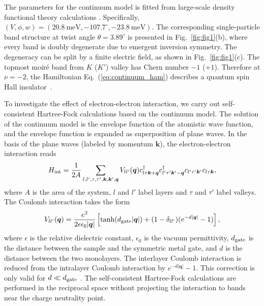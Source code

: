 \documentclass[twocolumn,aps,prl,superscriptaddress]{revtex4-2}
\begin{document}
The parameters for the continuum model is fitted from large-scale density functional theory calculations \cite{wang2023fractional}. Specifically, $(V, \phi, w) = (20.8~\text{meV}, -107.7^\circ,-23.8~\text{meV})$. The corresponding single-particle band structure at twist angle $\theta = 3.89^\circ$ is presented in Fig.~\ref{fig:fig1}(b), where every band is doubly degenerate due to emergent inversion symmetry. The degeneracy can be split by a finite electric field, as shown in Fig.~\ref{fig:fig1}(c).  The topmost moir\'e band from $K$ ($K'$) valley has Chern number $-1$ ($+1$).  Therefore at $\nu = -2$, the Hamiltonian Eq.~(\ref{eq:continuum_ham}) describes a quantum spin Hall insulator~\cite{wu2019topological,yu2020giant}. 

To investigate the effect of electron-electron interaction, we carry out self-consistent Hartree-Fock calculations based on the continuum model. The solution of the continuum model is the envelope function of the atomistic wave function, and the envelope function is expanded as superposition of plane waves. In the basis of the plane waves (labeled by momentum $\bm{k}$), the electron-electron interaction reads
\begin{equation}
H_{\rm int} = \frac{1}{2A} \sum_{l, l', \tau, \tau', \bm{k}, \bm{k}', \bm{q}} V_{ll'} (\bm{q}) {c_{l \tau \bm{k}+\bm{q}}^{\dagger}}  {c_{l' \tau' \bm{k}' -\bm{q}}^{\dagger}}  {c_{l' \tau' \bm{k}'}} c_{l \tau\bm{k}},
\end{equation}
where $A$ is the area of the system, $l$ and $l'$ label layers and $\tau$ and $\tau'$ label valleys. The Coulomb interaction takes the form \cite{chatterjee2020symmetry}
\begin{equation}\label{eq:coulomb}
    V_{ll'}(\bm{q}) = \frac{e^2}{2\epsilon\epsilon_0 |\bm{q}|} \left[\tanh(d_{\rm gate}|\bm{q}|) + (1-\delta_{ll'})(e^{-d |\bm{q}|}-1)\right],
\end{equation}
where $\epsilon$ is the relative dielectric constant, $\epsilon_0$ is the vacuum permittivity, $d_{\rm gate}$ is the distance between the sample and the symmetric metal gate, and $d$ is the distance between the two monolayers. The interlayer Coulomb interaction is reduced from the intralayer Coulomb interaction by $e^{-d |\bm{q}|} - 1$. This correction is only valid for $d \ll d_{\rm gate}$ \cite{chatterjee2020symmetry}. The self-consistent Hartree-Fock calculations are performed in the reciprocal space without projecting the interaction to bands near the charge neutrality point.
\end{document}
